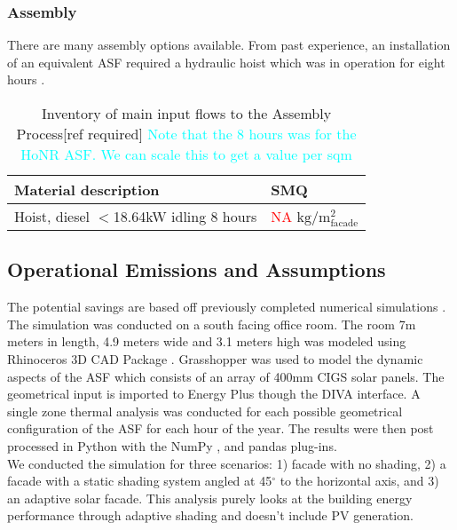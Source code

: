 \subsubsection*{Assembly}
There are many assembly options available. From past experience, an installation of an equivalent ASF required a hydraulic hoist which was in operation for eight hours \cite{jayathissa2015abs}. \\

\begin{table}[H]
\centering
\begin{tabular}{ll}
\hline
Material description & SMQ \\ \hline
Hoist, diesel  ${<}$18.64kW idling 8 hours & \textcolor{red}{NA} ${\mathrm{kg/m^2_{facade}}}$ \\
\hline
\end{tabular}
\caption{Inventory of main input flows to the Assembly Process[ref required] \textcolor{cyan}{Note that the 8 hours was for the HoNR ASF. We can scale this to get a value per sqm}}
\label{tab:AssemblyInv}
\end{table}


\subsection{Operational Emissions and Assumptions}
\label{ch:Meth:Opp}

The potential savings are based off previously completed numerical simulations \cite{jayathissa2015abs}. The simulation was conducted on a south facing office room. The room 7m meters in length, 4.9 meters wide and 3.1 meters high was modeled using Rhinoceros 3D CAD Package \cite{Rhino}. Grasshopper \cite{grasshopper} was used to model the dynamic aspects of the ASF which consists of an array of 400mm CIGS solar panels. The geometrical input is imported to Energy Plus \cite{energyplus} though the DIVA \cite{DIVA} interface. A single zone thermal analysis was conducted for each possible geometrical configuration of the ASF for each hour of the year. The results were then post processed in Python \cite{python} with the NumPy \cite{numpy}, and pandas \cite{pandas} plug-ins.\\

We conducted the simulation for three scenarios: 1) facade with no shading, 2) a facade with a static shading system angled at 45$^{\circ}$ to the horizontal axis, and 3) an adaptive solar facade. This analysis purely looks at the building energy performance through adaptive shading and doesn't include PV generation. \\

